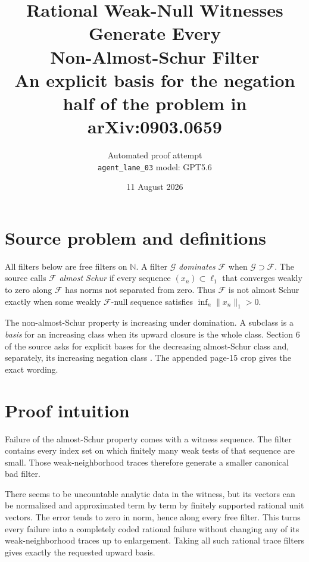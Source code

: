 \documentclass[10pt]{article}
\title{Rational Weak-Null Witnesses Generate Every\\
Non-Almost-Schur Filter\\
\large An explicit basis for the negation half of the problem in arXiv:0903.0659}
\author{Automated proof attempt\\
\texttt{agent\_lane\_03} \quad model: GPT5.6}
\date{11 August 2026}
\newcommand{\N}{\mathbb N}
\newcommand{\F}{\mathcal F}
\newcommand{\ellone}{\ell_1}
\begin{document}
\maketitle

\begin{center}
\end{center}

\section*{Source problem and definitions}

All filters below are free filters on $\N$.  A filter $\mathcal G$
\emph{dominates} $\F$ when $\mathcal G\supset\F$.  The source calls $\F$
\emph{almost Schur} if every sequence $(x_n)\subset\ellone$ that converges
weakly to zero along $\F$ has norms not separated from zero.  Thus $\F$ is
not almost Schur exactly when some weakly $\F$-null sequence satisfies
\(\inf_n\|x_n\|_1>0\).

The non-almost-Schur property is increasing under domination.  A subclass is
a \emph{basis} for an increasing class when its upward closure is the whole
class.  Section 6 of the source asks for explicit bases for the decreasing
almost-Schur class and, separately, its increasing negation class
\cite{source}.  The appended page-15 crop gives the exact wording.

\section*{Proof intuition}

Failure of the almost-Schur property comes with a witness sequence.  The
filter contains every index set on which finitely many weak tests of that
sequence are small.  Those weak-neighborhood traces therefore generate a
smaller canonical bad filter.

There seems to be uncountable analytic data in the witness, but its vectors
can be normalized and approximated term by term by finitely supported rational
unit vectors.  The error tends to zero in norm, hence along every free filter.
This turns every failure into a completely coded rational failure without
changing any of its weak-neighborhood traces up to enlargement.  Taking all
such rational trace filters gives exactly the requested upward basis.
\end{document}
